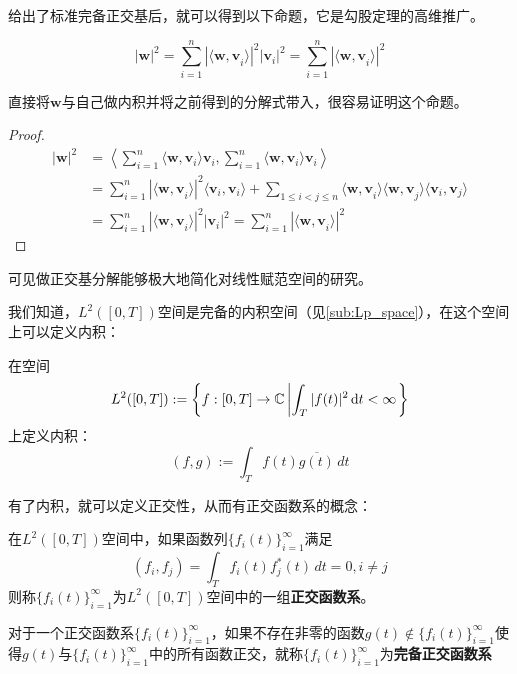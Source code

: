 \documentclass{ctexbook}
\begin{document}
给出了标准完备正交基后，就可以得到以下命题，它是勾股定理的高维推广。
\begin{proposition}
    \[|\mathbf{w}|^2=\sum_{i=1}^{n}|\langle\mathbf{w,v}_i\rangle|^2|\mathbf{v}_i|^2=\sum_{i=1}^{n}|\langle\mathbf{w,v}_i\rangle|^2\]
\end{proposition}
直接将$\mathbf{w}$与自己做内积并将之前得到的分解式带入，很容易证明这个命题。
\begin{proof}\begin{align*}
    |\mathbf{w}|^2 & =\left\langle \sum_{i=1}^{n}\langle \mathbf{w},\mathbf{v}_i\rangle \mathbf{v}_i,\sum_{i=1}^{n}\langle \mathbf{w},\mathbf{v}_i\rangle \mathbf{v}_i\right\rangle                                           \\
                   & =\sum_{i=1}^{n}|\langle\mathbf{w,v}_i\rangle|^2\langle\mathbf{v}_i,\mathbf{v}_i\rangle+\sum_{1\leq i<j\leq n}\langle \mathbf{w,v}_i\rangle\langle \mathbf{w,v}_j\rangle\langle \mathbf{v}_i,\mathbf{v}_j\rangle \\
                   & =\sum_{i=1}^{n}|\langle\mathbf{w,v}_i\rangle|^2|\mathbf{v}_i|^2=\sum_{i=1}^{n}|\langle\mathbf{w,v}_i\rangle|^2
\end{align*}\end{proof}
可见做正交基分解能够极大地简化对线性赋范空间的研究。

我们知道，$L^2([0,T])$空间是完备的内积空间（见\ref{sub:Lp_space}），在这个空间上可以定义内积：
\begin{definition}[函数空间上的内积]
    在空间\[L^2([0,T]):=\left\{f:[0,T]\rightarrow \mathbb{C} \left| \int_{T}|f(t)|^2\,\text dt<\infty\right.\right\}\]
上定义内积：
\[(f,g):=\int_{T}f(t)\overline{g(t)}\,dt \]
\end{definition}

有了内积，就可以定义正交性，从而有正交函数系的概念：
\begin{definition}[正交函数系]
    在$L^2([0,T])$空间中，如果函数列$\{f_i(t)\}_{i=1}^{\infty}$满足
\[(f_i,f_j)=\int_{T}f_i(t)f_j^*(t)\,dt=0,i\neq j\]
则称$\{f_i(t)\}_{i=1}^{\infty}$为$L^2([0,T])$空间中的一组\textbf{正交函数系}。
\end{definition}

\begin{definition}[完备正交函数系]
    对于一个正交函数系$\{f_i(t)\}_{i=1}^{\infty}$，如果不存在非零的函数$g(t)\notin\{f_i(t)\}_{i=1}^{\infty}$使得$g(t)$与$\{f_i(t)\}_{i=1}^{\infty}$中的所有函数正交，就称$\{f_i(t)\}_{i=1}^{\infty}$为\textbf{完备正交函数系}
\end{definition}
\end{document}
